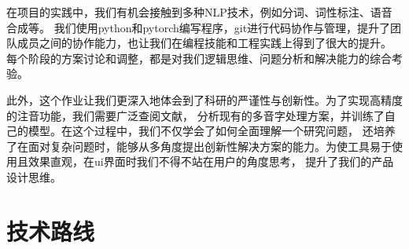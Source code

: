 \documentclass[12pt,hyperref,a4paper,UTF8]{ctexart}
\begin{document}
在项目的实践中，我们有机会接触到多种NLP技术，例如分词、词性标注、语音合成等。
我们使用python和pytorch编写程序，git进行代码协作与管理，提升了团队成员之间的协作能力，也让我们在编程技能和工程实践上得到了很大的提升。
每个阶段的方案讨论和调整，都是对我们逻辑思维、问题分析和解决能力的综合考验。

此外，这个作业让我们更深入地体会到了科研的严谨性与创新性。为了实现高精度的注音功能，我们需要广泛查阅文献，
分析现有的多音字处理方案，并训练了自己的模型。在这个过程中，我们不仅学会了如何全面理解一个研究问题，
还培养了在面对复杂问题时，能够从多角度提出创新性解决方案的能力。为使工具易于使用且效果直观，在ui界面时我们不得不站在用户的角度思考，
提升了我们的产品设计思维。
\section{技术路线}
\end{document}
